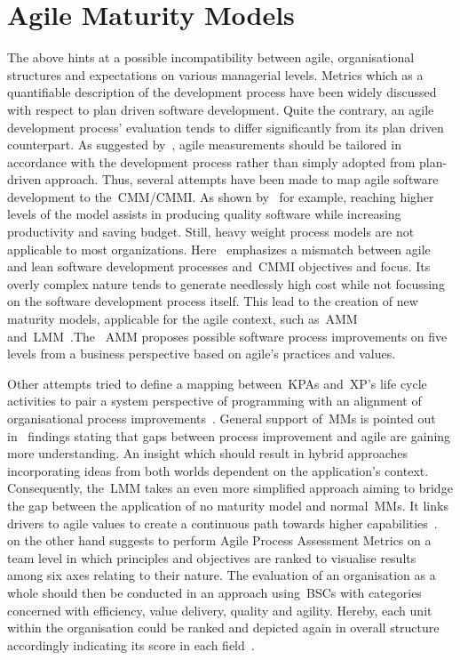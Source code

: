 
\section{Agile Maturity Models}

The above hints at a possible incompatibility between agile, organisational structures and expectations on various managerial levels. Metrics which as a quantifiable description of the development process have been widely discussed with respect to plan driven software development. Quite the contrary, an agile development process' evaluation tends to differ significantly from its plan driven counterpart. As suggested by~\citet{hartmann2006appagilemes}, agile measurements should be tailored in accordance with the development process rather than simply adopted from plan-driven approach.
Thus, several attempts have been made to map agile software development to the~\ac{CMM}/\ac{CMMI}. As shown by~\citet{pitterman2000maturity} for example, reaching higher levels of the model assists in producing quality software while increasing productivity and saving budget. 
Still, heavy weight process models are not applicable to most organizations. Here~\citet{chetankumar2009amm} emphasizes a mismatch between agile and lean software development processes and~\ac{CMMI} objectives and focus. Its overly complex nature tends to generate needlessly high cost while not focussing on the software development process itself. This lead to the creation of new maturity models, applicable for the agile context, such as~\ac{AMM}~\citep{chetankumar2009amm} and~\ac{LMM}~\citep{buglione2011lmm}.The ~\ac{AMM} proposes possible software process improvements on five levels from a business perspective based on agile's practices and values. 

Other attempts tried to define a mapping between~\ac{KPA}s and~\ac{XP}'s life cycle activities to pair a system perspective of programming with an alignment of organisational process improvements~\citep{paulk2011xpcmm}. General support of~\ac{MM}s is pointed out in~\citet{turner2002agilecmmi} findings stating that gaps between process improvement and agile are gaining more understanding. An insight which should result in hybrid approaches incorporating ideas from both worlds dependent on the application's context.
Consequently, the~\ac{LMM} takes an even more simplified approach aiming to bridge the gap between the application of no maturity model and normal~\acs{MM}s. It links drivers to agile values to create a continuous path towards higher capabilities~\citep{buglione2011lmm}.
~\citet{leffingwell2007scalelargecorps} on the other hand suggests to perform Agile Process Assessment Metrics on a team level in which principles and objectives are ranked to visualise results among six axes relating to their nature. The evaluation of an organisation as a whole should then be conducted in an approach using~\ac{BSCs} with categories concerned with efficiency, value delivery, quality and agility. Hereby, each unit within the organisation could be ranked and depicted again in overall structure accordingly indicating its score in each field~\citep{leffingwell2007scalelargecorps}.

